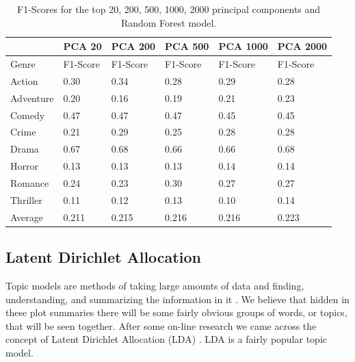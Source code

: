 \documentclass[11pt]{article}
\begin{document}
\begin{table}[h]
	\label{tab:randf_scores}
\begin{center}
	\begin{tabular}{| l | l | l | l | l | l |}
		\hline		         
                  & PCA 20    & PCA 200           & PCA 500     & PCA 1000  & PCA 2000 \\\hline
        Genre     & F1-Score  & F1-Score          & F1-Score    & F1-Score  & F1-Score\\\hline		
	  	Action    & 0.30     & 0.34		          & 0.28        & 0.29      & 0.28\\
		Adventure & 0.20     & 0.16		          & 0.19        & 0.21      & 0.23\\
		Comedy    & 0.47     & 0.47		          & 0.47        & 0.45      & 0.45\\
		Crime     & 0.21     & 0.29		          & 0.25        & 0.28      & 0.28\\
		Drama     & 0.67     & 0.68		          & 0.66        & 0.66      & 0.68\\
		Horror    & 0.13     & 0.13		          & 0.13        & 0.14      & 0.14\\
		Romance   & 0.24     & 0.23		          & 0.30        & 0.27      & 0.27\\ 
		Thriller  & 0.11     & 0.12		          & 0.13        & 0.10      & 0.14\\\hline
		Average   & 0.211     & 0.215 	          & 0.216       & 0.216     & 0.223 \\\hline       
	\end{tabular} 
\end{center}
	\caption{F1-Scores for the top 20, 200, 500, 1000, 2000 principal components and Random Forest model.}
\end{table}


\subsection{Latent Dirichlet Allocation}
\label{sec:lda}

Topic models are methods of taking large amounts of data and finding, understanding, and summarizing the information in it \cite{wiki:topic_model, kdnuggets:topic_model}. We believe that hidden in these plot summaries there will be some fairly obvious groups of words, or topics, that will be seen together. After some on-line research we came across the concept of Latent Dirichlet Allocation (LDA) \cite{blei2003}. LDA is a fairly popular topic model. 
\end{document}
